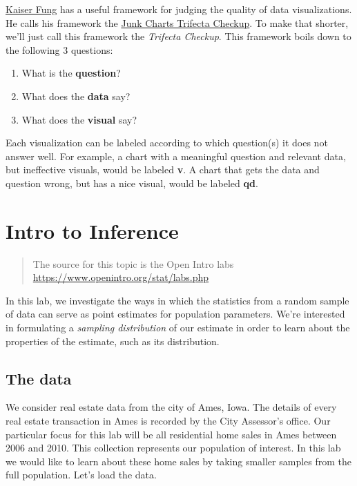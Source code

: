 \documentclass[]{book}
\providecommand{\tightlist}{%
  \setlength{\itemsep}{0pt}\setlength{\parskip}{0pt}}
\theoremstyle{definition}
\theoremstyle{definition}
\theoremstyle{remark}
\begin{document}
\href{http://junkcharts.typepad.com/numbersruleyourworld/biography.html}{Kaiser
Fung} has a useful framework for judging the quality of data
visualizations. He calls his framework the
\href{http://junkcharts.typepad.com/junk_charts/junk-charts-trifecta-checkup-the-definitive-guide.html}{Junk
Charts Trifecta Checkup}. To make that shorter, we'll just call this
framework the \emph{Trifecta Checkup}. This framework boils down to the
following 3 questions:

\begin{enumerate}
\def\labelenumi{\arabic{enumi}.}
\tightlist
\item
  What is the \textbf{question}?
\item
  What does the \textbf{data} say?
\item
  What does the \textbf{visual} say?
\end{enumerate}

Each visualization can be labeled according to which question(s) it does
not answer well. For example, a chart with a meaningful question and
relevant data, but ineffective visuals, would be labeled \textbf{v}. A
chart that gets the data and question wrong, but has a nice visual,
would be labeled \textbf{qd}.

\hypertarget{inference}{\chapter*{Intro to Inference}\label{inference}}

\begin{quote}
The source for this topic is the Open Intro labs
\url{https://www.openintro.org/stat/labs.php}
\end{quote}

In this lab, we investigate the ways in which the statistics from a
random sample of data can serve as point estimates for population
parameters. We're interested in formulating a \emph{sampling
distribution} of our estimate in order to learn about the properties of
the estimate, such as its distribution.

\section*{The data}\label{the-data-1}

We consider real estate data from the city of Ames, Iowa. The details of
every real estate transaction in Ames is recorded by the City Assessor's
office. Our particular focus for this lab will be all residential home
sales in Ames between 2006 and 2010. This collection represents our
population of interest. In this lab we would like to learn about these
home sales by taking smaller samples from the full population. Let's
load the data.
\end{document}
